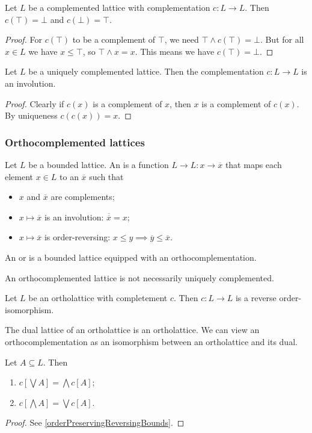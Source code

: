 \begin{lemma}
Let $L$ be a complemented lattice with complementation $c:L\to L$. Then $c(\top) = \bot$ and $c(\bot) = \top$.
\end{lemma}
\begin{proof}
For $c(\top)$ to be a complement of $\top$, we need $\top \wedge c(\top) = \bot$. But for all $x\in L$ we have $x\leq \top$, so $\top\wedge x = x$. This means we have $c(\top) = \bot$.
\end{proof}

\begin{lemma} \label{uniqueComplementInvolution}
Let $L$ be a uniquely complemented lattice. Then the complementation $c:L\to L$ is an involution.
\end{lemma}
\begin{proof}
Clearly if $c(x)$ is a complement of $x$, then $x$ is a complement of $c(x)$. By uniqueness $c(c(x)) = x$.
\end{proof}

\subsubsection{Orthocomplemented lattices}
\begin{definition}
Let $L$ be a bounded lattice. An  is a function $L \to L: x \to \overline{x}$ that maps each element $x\in L$ to an  $\overline{x}$ such that
\begin{itemize}
\item $x$ and $\overline{x}$ are complements;
\item $x\mapsto \overline{x}$ is an involution: $\overline{\overline{x}} = x$;
\item $x\mapsto \overline{x}$ is order-reversing: $x\leq y \implies \overline{y} \leq \overline{x}$.
\end{itemize}
An  or  is a bounded lattice equipped with an orthocomplementation.
\end{definition}
An orthocomplemented lattice is not necessarily uniquely complemented.

\begin{lemma}
Let $L$ be an ortholattice with completement $c$. Then $c: L \to L$ is a reverse order-isomorphism.
\end{lemma}
\begin{corollary}
The dual lattice of an ortholattice is an ortholattice. We can view an orthocomplementation as an isomorphism between an ortholattice and its dual.
\end{corollary}
\begin{corollary}
Let $A\subseteq L$. Then
\begin{enumerate}
\item $c\left[\bigvee A\right] = \bigwedge c[A]$;
\item $c\left[\bigwedge A\right] = \bigvee c[A]$.
\end{enumerate}
\end{corollary}
\begin{proof}
See \ref{orderPreservingReversingBounds}.
\end{proof}

